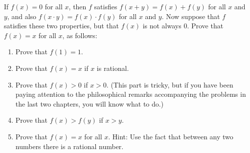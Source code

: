 \begin{pr} \label{3.17}
  If $f(x) = 0$ for all $x$, then $f$ satisfies $f(x + y) = f(x) + f(y)$ for all
  $x$ and $y$, and also $f(x \cdot y) = f(x) \cdot f(y)$ for all $x$ and $y$. Now suppose
  that $f$ satisfies these two properties, but that $f(x)$ is not always $0$. Prove
  that $f(x) = x$ for all $x$, as follows:
  \begin{enumerate}[label = (\alph*)]
    \item Prove that $f(1) = 1$.
    \item Prove that $f(x) = x$ if $x$ is rational.
    \item Prove that $f(x) > 0$ if $x > 0$. (This part is tricky, but if you have
    been paying attention to the philosophical remarks accompanying the problems
    in the last two chapters, you will know what to do.)
    \item Prove that $f(x) > f(y)$ if $x > y$.
    \item Prove that $f(x) = x$ for all $x$. Hint: Use the fact that between
    any two numbers there is a rational number.
  \end{enumerate}
\end{pr}
